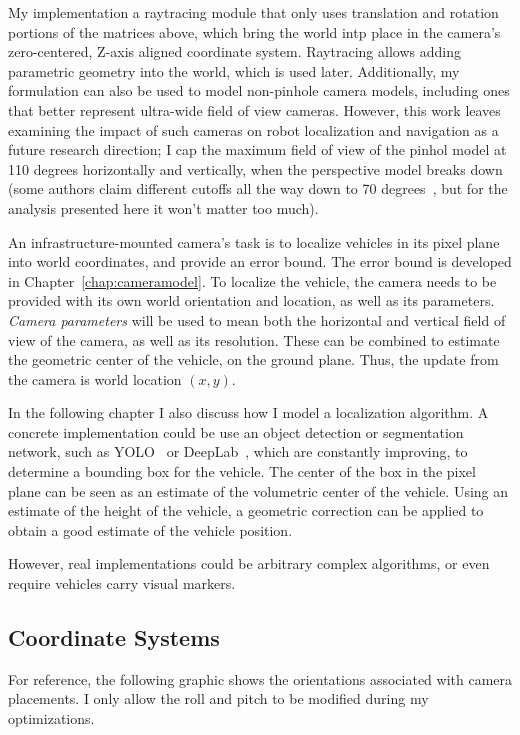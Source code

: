 \documentclass[a4paper,12pt,twoside,openright]{report}
\begin{document}
My implementation a raytracing module that only uses
translation and rotation portions of the matrices above, which bring the world intp place
in the camera's zero-centered, Z-axis aligned coordinate system. Raytracing
allows adding parametric geometry into the world, which is used later.
Additionally, my formulation can also be used to model non-pinhole camera models,
including ones that better represent ultra-wide field of view cameras. However, this work leaves
examining the impact of such cameras on robot localization and navigation as
a future research direction; I cap the maximum field of view of the pinhol model
at 110 degrees horizontally and vertically, when the perspective model
breaks down~\cite{fleckperspective} (some authors claim different cutoffs all the way down
to 70 degrees~\cite{sharless2010pannini}, but for the analysis presented here it won't 
matter too much). 

An infrastructure-mounted camera's task is to localize vehicles in its pixel plane 
into world coordinates, and provide an error bound. The error bound is developed 
in Chapter~\ref{chap:cameramodel}. To localize the vehicle, the camera needs to
be provided with its own world orientation and location, as well as its parameters.
\textit{Camera parameters} will be used to mean both the horizontal
and vertical field of view of the camera, as well as its resolution. These can be
combined to estimate the geometric center of the vehicle, on the ground plane. Thus,
the update from the camera is world location $(x,y)$.

In the following chapter I also discuss how I model a localization algorithm. A
 concrete implementation could be use an object detection or segmentation network,
such as YOLO~\cite{redmon2018yolov3} or DeepLab~\cite{chen2017rethinking}, which are constantly
improving, to determine a bounding box for the vehicle. The center of the box in the pixel plane
can be seen as an estimate of the volumetric center of the vehicle. 
Using an estimate of the height of the vehicle, a geometric correction can be applied 
to obtain a good estimate of the vehicle position. %

However, real implementations could be arbitrary complex algorithms,
or even require vehicles carry visual markers.

\subsection{Coordinate Systems}
For reference, the following graphic shows the orientations
associated with camera placements. I only allow the roll and pitch
to be modified during my optimizations.
\end{document}
